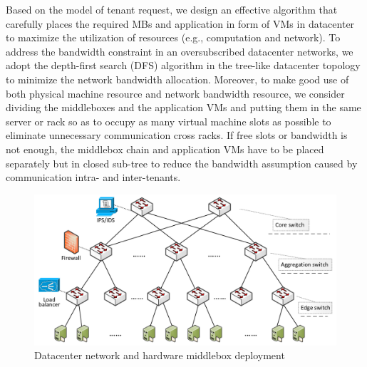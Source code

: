 \documentclass[10pt, conference, letterpaper]{IEEEtran}
\begin{document}
Based on the model of tenant request, we design an effective algorithm that carefully places the required MBs and application in form of VMs in datacenter to maximize the utilization of resources (e.g., computation and network). To address the bandwidth constraint in an oversubscribed datacenter networks, we adopt the depth-first search (DFS) algorithm in the tree-like datacenter topology to minimize the network bandwidth allocation. Moreover, to make good use of both physical machine resource and network bandwidth resource, we consider dividing the middleboxes and the application VMs and putting them in the same server or rack so as to occupy as many virtual machine slots as possible to eliminate unnecessary communication cross racks. If free slots or bandwidth is not enough, the middlebox chain and application VMs have to be placed separately but in closed sub-tree to reduce the bandwidth assumption caused by communication intra- and inter-tenants. 


\begin{figure}
	\centering
		\includegraphics[width=3 in]{fig/topology.pdf}
	\caption{Datacenter network and hardware middlebox deployment}
	\label{fig:topo}
\end{figure}

\end{document}
